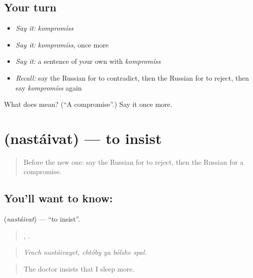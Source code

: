 \subsection*{Your turn}
\begin{itemize}
\raggedright
  \item \emph{Say it:} \emph{kompromíss}
  \item \emph{Say it:} \emph{kompromíss}, once more
  \item \emph{Say it:} a sentence of your own with \emph{kompromíss}
  \item \emph{Recall:} say the Russian for to contradict, then the Russian for to reject, then say \emph{kompromíss} again
\end{itemize}

\begin{tcolorbox}[breakable,colback=teal!4,colframe=teal!35!black,title={Before you move on}]
What does  mean? (\textquotedblleft{}A compromise\textquotedblright{}.) Say it once more.
\end{tcolorbox}
\section[\texorpdfstring{\ru{настаивать} (nastáivat)}{настаивать (nastáivat)}]{ (nastáivat) — to insist}

\label{lesson:RU-C341-nastaivat}



\begin{quote}
Before the new one: say the Russian for to reject, then the Russian for a compromise.
\end{quote}

\subsection*{You'll want to know: }
\textbf{} (\emph{nastáivat}) — \textquotedblleft{}to insist\textquotedblright{}.

\begin{quote}
 ,    .
\end{quote}

\begin{quote}
\emph{Vrach nastáivayet, chtóby ya bólshe spal.}
\end{quote}

\begin{quote}
The doctor insists that I sleep more.
\end{quote}

